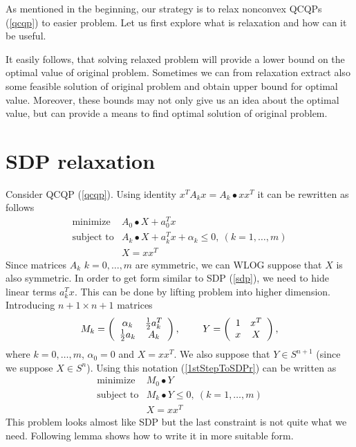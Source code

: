 \documentclass[10pt,oneside]{book}
\theoremstyle{definition}
\begin{document}
As mentioned in the beginning, our strategy is to relax nonconvex QCQPs (\ref{qcqp}) to easier problem. Let us first explore what is relaxation and how can it be useful.


It easily follows, that solving relaxed problem will provide a lower bound on the optimal value of original problem. Sometimes we can from relaxation extract also some feasible solution of original problem and obtain upper bound for optimal value. Moreover, these bounds may not only give us an idea about the optimal value, but can provide a means to find optimal solution of original problem. 

\section{SDP relaxation}
Consider QCQP (\ref{qcqp}). Using identity $x^TA_kx = A_k\bullet xx^T$ it can be rewritten as follows
\begin{equation} 
\label{1stStepToSDPr}
\begin{array}{ll}
\mbox{minimize}& A_0\bullet X + a_0^Tx \\
\mbox{subject to}& A_k\bullet X+ a_k^Tx + \alpha_k \leq 0, \  (k = 1,\dots ,m)\\
& X = xx^T
\end{array} 
\end{equation}
Since matrices $A_k$ $k=0,\dots, m$ are symmetric, we can WLOG suppose that $X$ is also symmetric. In order to get form similar to SDP (\ref{sdp}), we need to hide linear terms $a_k^Tx$. This can be done by lifting problem into higher dimension. Introducing $n+1\times n+1$ matrices
$$M_k = \left(
\begin{array}{cc}
\alpha_k & {1\over 2}a_k^T \\
{1\over 2}a_k & A_k
\end{array}\right), 
\ \ \ \ \ \ \
Y =  \left(
\begin{array}{cc}
1 & x^T \\
x & X
\end{array}\right), 
$$
where $k=0,\dots ,m$, $\alpha_0=0$ and $X=xx^T$. We also suppose that $Y\in S^{n+1}$ (since we suppose $X\in S^n$).  Using this notation (\ref{1stStepToSDPr}) can be written as
\begin{equation} 
\label{2ndStepToSDPr}
\begin{array}{ll}
\mbox{minimize}& M_0\bullet Y \\
\mbox{subject to}& M_k\bullet Y \leq 0, \  (k = 1,\dots ,m)\\
& X = xx^T
\end{array} 
\end{equation}
This problem looks almost like SDP but the last constraint is not quite what we need. Following lemma shows how to write it in more suitable form.
\end{document}
